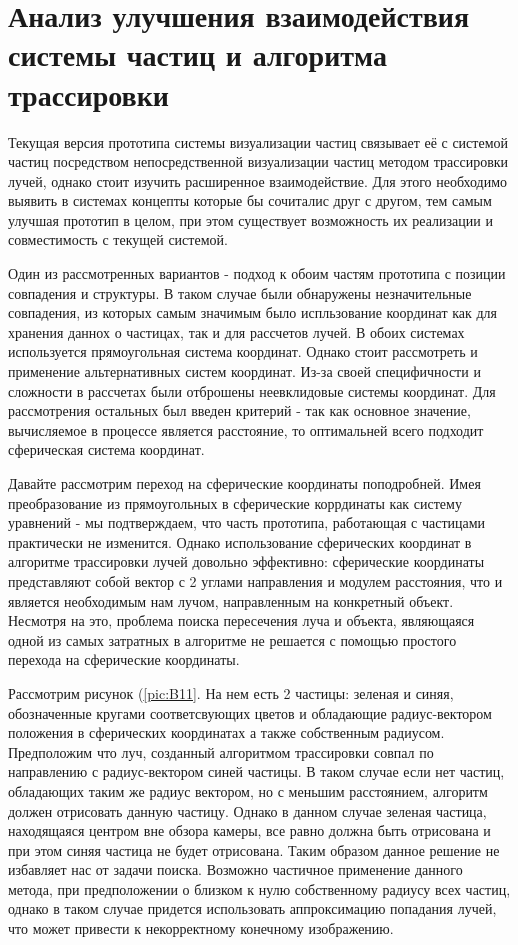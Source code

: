 \section{Анализ улучшения взаимодействия системы частиц и алгоритма трассировки}

Текущая версия прототипа системы визуализации частиц связывает её с системой частиц посредством непосредственной визуализации частиц методом трассировки лучей, однако стоит изучить расширенное взаимодействие. Для этого необходимо выявить в системах концепты которые бы сочиталис друг с другом, тем самым улучшая прототип в целом, при этом существует возможность их реализации и совместимость с текущей системой.

Один из рассмотренных вариантов - подход к обоим частям прототипа с позиции совпадения и  структуры. В таком случае были обнаружены незначительные совпадения, из которых самым значимым было испльзование координат как для хранения даннох о частицах, так и для рассчетов лучей. В обоих системах используется прямоугольная система координат. Однако стоит рассмотреть и применение альтернативных систем координат. Из-за своей специфичности и сложности в рассчетах были отброшены неевклидовые системы координат. Для рассмотрения остальных был введен критерий - так как основное значение, вычисляемое в процессе является расстояние, то оптимальней всего  подходит сферическая система координат.

Давайте рассмотрим переход на сферические координаты поподробней. Имея преобразование из прямоугольных в сферические коррдинаты как систему уравнений - мы подтверждаем, что часть прототипа, работающая с частицами практически не изменится. Однако использование сферических координат в алгоритме трассировки лучей довольно эффективно: сферические координаты представляют собой вектор с 2 углами направления и модулем расстояния, что и является необходимым нам лучом, направленным на конкретный объект. Несмотря на это, проблема поиска пересечения луча и объекта, являющаяся одной из самых затратных в алгоритме не решается с помощью простого перехода на сферические координаты.

Рассмотрим рисунок (\ref{pic:B11}. На нем есть 2 частицы: зеленая и синяя, обозначенные кругами соответсвующих цветов и обладающие радиус-вектором положения в сферических координатах а также собственным радиусом. Предположим что луч, созданный алгоритмом трассировки совпал по направлению с радиус-вектором синей частицы. В таком случае если нет частиц, обладающих таким же радиус вектором, но с меньшим расстоянием, алгоритм должен отрисовать данную частицу. Однако в данном случае зеленая частица, находящаяся центром вне обзора камеры, все равно должна быть отрисована и при этом синяя частица не будет отрисована. Таким образом данное решение не избавляет нас от задачи поиска. Возможно частичное применение данного метода, при предположении о близком к нулю собственному радиусу всех частиц, однако в таком случае придется использовать аппроксимацию попадания лучей, что может привести к некорректному конечному изображению.


